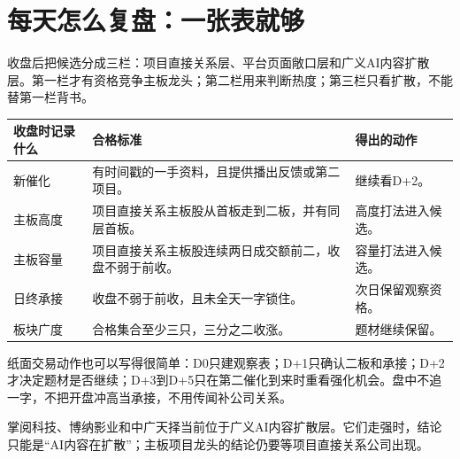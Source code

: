 \section{每天怎么复盘：一张表就够}

收盘后把候选分成三栏：项目直接关系层、平台页面敞口层和广义AI内容扩散层。第一栏才有资格竞争主板龙头；第二栏用来判断热度；第三栏只看扩散，不能替第一栏背书。

\begin{exhibitbox}[展品：收盘检查表]
\begin{tabularx}{\textwidth}{L{2.3cm}X L{3.0cm}}
\toprule
收盘时记录什么 & 合格标准 & 得出的动作 \\
\midrule
新催化 & 有时间戳的一手资料，且提供播出反馈或第二项目。 & 继续看D+2。 \\
主板高度 & 项目直接关系主板股从首板走到二板，并有同层首板。 & 高度打法进入候选。 \\
主板容量 & 项目直接关系主板股连续两日成交额前二，收盘不弱于前收。 & 容量打法进入候选。 \\
日终承接 & 收盘不弱于前收，且未全天一字锁住。 & 次日保留观察资格。 \\
板块广度 & 合格集合至少三只，三分之二收涨。 & 题材继续保留。 \\
\bottomrule
\end{tabularx}
\end{exhibitbox}

纸面交易动作也可以写得很简单：D0只建观察表；D+1只确认二板和承接；D+2才决定题材是否继续；D+3到D+5只在第二催化到来时重看强化机会。盘中不追一字，不把开盘冲高当承接，不用传闻补公司关系。

掌阅科技、博纳影业和中广天择当前位于广义AI内容扩散层。它们走强时，结论只能是“AI内容在扩散”；主板项目龙头的结论仍要等项目直接关系公司出现。
